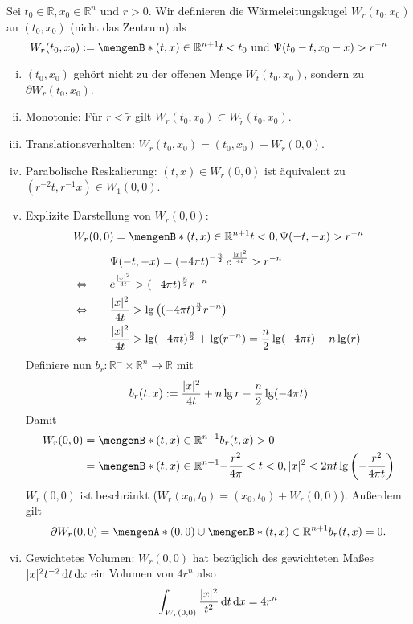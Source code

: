 \begin{definition}[Wärmeleitungskugel]
	Sei $t_0 \in \mathbb{R}, x_0 \in \mathbb{R}^n$ und $r >0$. Wir definieren die Wärmeleitungskugel $W_r(t_0,x_0)$ an $(t_0,x_0)$ (nicht das Zentrum) als
	\[
		W_r(t_0,x_0) := \set[(t,x) \in \mathbb{R}^{n+1}]{ t<t_0 \text{ und } \Psi(t_0-t, x_0-x)> r^{-n}}
	\]
\end{definition}
\begin{bemerkung}
	\begin{enumerate}[(i)]
		\item $(t_0,x_0)$ gehört nicht zu der offenen Menge $W_t(t_0,x_0)$, sondern zu \\ $\partial W_r(t_0,x_0)$.
		\item Monotonie: Für $r < \tilde r$ gilt $ W_r(t_0,x_0) \subset W_{\tilde r}(t_0,x_0)$.
		\item Translationsverhalten: $W_r(t_0,x_0) = (t_0,x_0)+ W_r(0,0)$.
		\item Parabolische Reskalierung: $(t,x) \in W_r(0,0)$ ist äquivalent zu $( r^{-2}t, r^{-1}x) \in W_1(0,0)$.
		\item Explizite Darstellung von $W_r(0,0)$:
		\[
			W_r(0,0) = \set[(t,x) \in \mathbb{R}^{n+1}]{t<0, \Psi(-t,-x)> r^{-n}}
		\] 
		\begin{align*}
			& \qquad \Psi(-t,-x) = \left( -4 \pi t \right)^{- \frac{n}{2}} e^{\frac{\lvert x\rvert^2}{4t}} > r^{-n} \\
			\Leftrightarrow & \qquad e^{\frac{\lvert x\rvert^2}{4t}} > (-4 \pi t)^{\frac{n}{2}} r^{-n}\\
			\Leftrightarrow & \qquad \frac{\lvert x\rvert^2}{4t} > \lg \left( (-4 \pi t)^{\frac{n}{2}} r^{-n} \right) \\
			\Leftrightarrow & \qquad \frac{\lvert x\rvert^2}{4t} > \lg (-4 \pi t)^{\frac{n}{2}} + \lg (r^{-n}) = \frac{n}{2} \lg (-4 \pi t)- n \lg ( r)
		\end{align*}
		Definiere nun $b_r: \mathbb{R}^- \times \mathbb{R}^n \to \mathbb{R}$ mit
		\[
			b_r(t,x):= \frac{\lvert x\rvert^2}{4t} + n \lg r - \frac{n}{2} \lg(-4 \pi t)
		\]
		Damit
		\begin{align*}
			W_r(0,0) &= \set[(t,x) \in \mathbb{R}^{n+1}]{b_r(t,x)>0} \\
			&= \set[(t,x) \in \mathbb{R}^{n+1}]{- \frac{r^2}{4 \pi} < t < 0 , \abs{x}^2 < 2nt \lg \left( - \frac{r^2}{4 \pi t} \right)}
		\end{align*} 
		$W_r(0,0)$ ist beschränkt ($W_r(x_0,t_0)= (x_0,t_0)+ W_r(0,0)$). Außerdem gilt
		\[
			\partial W_r(0,0) = \set{(0,0)} \cup \set[(t,x) \in \mathbb{R}^{n+1}]{b_r(t,x)=0}.
		\]
		\item Gewichtetes Volumen: $W_r(0,0)$ hat bezüglich des gewichteten Maßes $\lvert x\rvert^2 t^{-2} \, \mathrm{d}t \, \mathrm{d}x$ ein Volumen von $4 r^n$ also
		\[
			\int_{W_r(0,0)}^{} \frac{\lvert x\rvert^2}{t^2} \,\mathrm{d}t \, \mathrm{d}x = 4 r^n
		\]
	\end{enumerate}
\end{bemerkung}

